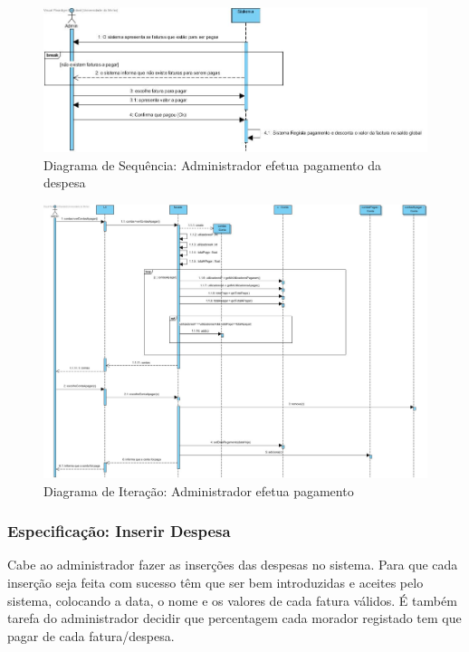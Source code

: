 \begin{figure}[htb!]
	\centering
	\includegraphics[scale=0.5]{imagens/diagramaSeq/EfetuaPagamentoDespesa}  
	\caption{Diagrama de Sequência: Administrador efetua pagamento da despesa }  
\end{figure}


\begin{figure}[htb!]
	\centering
	\includegraphics[scale=0.345]{imagens/diagramaIt/AdminPagaFactura}  
	\caption{Diagrama de Iteração: Administrador efetua pagamento }  
\end{figure}


\newpage \clearpage 

\subsubsection{Especificação: Inserir Despesa}

Cabe ao administrador fazer as inserções das despesas no sistema. Para que cada inserção seja feita com sucesso têm que ser bem introduzidas e aceites pelo sistema, colocando a data, o nome e os valores de cada fatura válidos.
É também tarefa do administrador decidir que percentagem cada morador registado tem que pagar de cada fatura/despesa.

